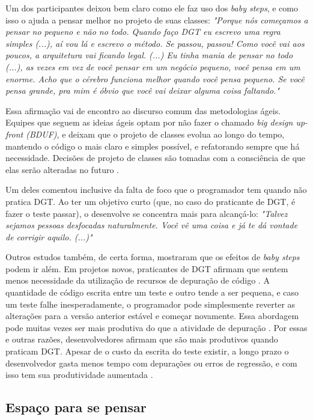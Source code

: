 Um dos participantes deixou bem claro como ele faz uso dos \textit{baby steps}, e como
isso o ajuda a pensar melhor no projeto de suas classes:
\textit{"Porque nós começamos a pensar no pequeno e não no todo. Quando faço DGT eu escrevo
uma regra simples (...), aí vou lá e escrevo o método. Se passou, passou! Como você vai aos poucos,
a arquitetura vai ficando legal. (...) Eu tinha mania de pensar no todo (...), as vezes
em vez de você pensar em um negócio pequeno, você pensa em um enorme. Acho que o cérebro funciona
melhor quando você pensa pequeno. Se você pensa grande, pra mim é óbvio que você vai deixar
alguma coisa faltando."}

Essa afirmação vai de encontro ao discurso comum das metodologias ágeis.
Equipes que seguem as ideias ágeis optam por não fazer o chamado \textit{big design up-front (BDUF)},
e deixam que o projeto de classes evolua ao longo do tempo, mantendo o código o mais claro e
simples possível, e refatorando sempre que há necessidade. Decisões de
projeto de classes são tomadas com a consciência de que elas serão alteradas no futuro
\cite{is-design-dead}.

Um deles comentou inclusive da falta de foco que o programador tem quando não pratica DGT.
Ao ter um objetivo curto (que, no caso do praticante de DGT, é fazer o teste passar), o
desenvolve se concentra mais para alcançá-lo:
\textit{"Talvez sejamos pessoas desfocadas naturalmente. Você vê uma coisa e já te dá vontade
de corrigir aquilo. (...)"}

Outros estudos também, de certa forma, mostraram que os efeitos de \textit{baby steps}
podem ir além.
Em projetos novos, praticantes de DGT afirmam que sentem menos necessidade da
utilização de recursos de depuração de código \cite{george-williams-experiment} 
\cite{janzen-arch-improvement}. 
A quantidade de código
escrita entre um teste e outro tende a ser pequena, e caso um teste falhe
inesperadamente, o programador pode simplesmente reverter as alterações para a 
versão anterior estável e começar novamente. Essa abordagem pode muitas vezes
ser mais produtiva do que a atividade de depuração 
\cite{janzen-arch-improvement}. Por essas e outras razões, desenvolvedores afirmam 
que são mais produtivos quando praticam DGT. Apesar de o custo da escrita do teste
existir, a longo prazo o desenvolvedor gasta menos tempo com depurações ou 
erros de regressão, e com isso tem sua produtividade aumentada
\cite{george-e-williams}.

\subsection{Espaço para se pensar}

